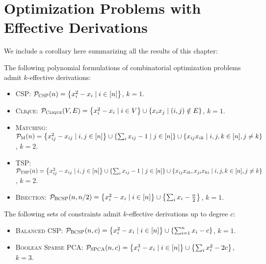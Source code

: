 \section{Optimization Problems with Effective Derivations}
We include a corollary here summarizing all the results of this chapter:
\begin{corollary}\label{cor:effective_list}
The following polynomial formulations of combinatorial optimization problems admit $k$-effective derivations:
\begin{itemize}
\item \textsc{CSP}: $\pcsp(n) = \csp$, $k = 1$.
\item \textsc{Clique}: $\pclique(V,E) = \clique$, $k = 1$.
\item \textsc{Matching}: $\pmatch(n) = \matching$, $k = 2$.
\item \textsc{TSP}: $\ptsp(n) = \tsp$, $k = 2$.
\item \textsc{Bisection}: $\pbcsp(n,n/2) = \bisec$, $k = 1$.
\end{itemize}
The following sets of constraints admit $k$-effective derivations up to degree $c$:
\begin{itemize}
\item \textsc{Balanced CSP}: $\pbcsp(n,c) = \bcsp{n}{c}$, $k = 1$.
\item \textsc{Boolean Sparse PCA}: $\pspca(n,c) = \bspca{n}{2c}$, $k = 3$.
\end{itemize}
\end{corollary}
